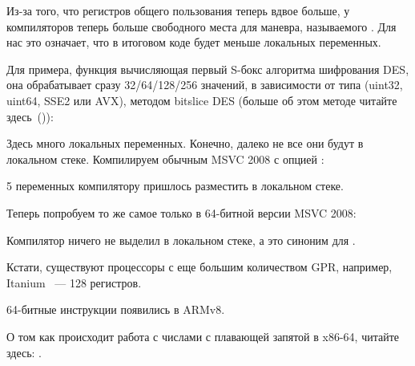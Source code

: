 Из-за того, что регистров общего пользования теперь вдвое больше, у компиляторов теперь больше 
свободного места для маневра, называемого .
Для нас это означает, что в итоговом коде будет меньше локальных переменных.

Для примера, функция вычисляющая первый S-бокс алгоритма шифрования DES, 
она обрабатывает сразу 32/64/128/256 значений, в зависимости от типа  (uint32, uint64, SSE2 или AVX), 
методом bitslice DES (больше об этом методе читайте здесь~()):



Здесь много локальных переменных. Конечно, далеко не все они будут в локальном стеке. 
Компилируем обычным MSVC 2008 с опцией :



5 переменных компилятору пришлось разместить в локальном стеке.

Теперь попробуем то же самое только в 64-битной версии MSVC 2008:



Компилятор ничего не выделил в локальном стеке, а  это синоним для .

\iffalse
Кстати, видно, что функция сохраняет регистры \RCX, \RDX в отведенных для 
этого вызываемой функцией местах, 
а \Reg{8} и \Reg{9} не сохраняет, а начинает использовать их сразу.

\fi

Кстати, существуют процессоры с еще большим количеством \ac{GPR}, например, 
Itanium ~--- 128 регистров.


64-битные инструкции появились в ARMv8.


О том как происходит работа с числами с плавающей запятой в x86-64, читайте здесь: .

